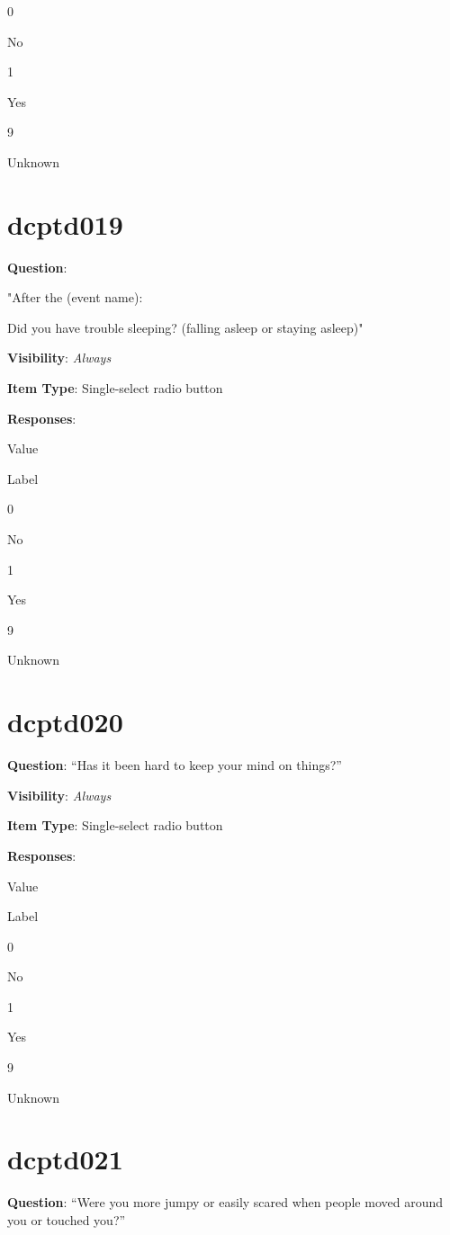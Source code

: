 \documentclass[]{book}
\begin{document}
0

No

1

Yes

9

Unknown

\hypertarget{dcptd019}{%
\section{dcptd019}\label{dcptd019}}

\textbf{Question}:

"After the (event name):

Did you have trouble sleeping? (falling asleep or staying asleep)"

\textbf{Visibility}: \emph{Always}

\textbf{Item Type}: Single-select radio button

\textbf{Responses}:

Value

Label

0

No

1

Yes

9

Unknown

\hypertarget{dcptd020}{%
\section{dcptd020}\label{dcptd020}}

\textbf{Question}: ``Has it been hard to keep your mind on things?''

\textbf{Visibility}: \emph{Always}

\textbf{Item Type}: Single-select radio button

\textbf{Responses}:

Value

Label

0

No

1

Yes

9

Unknown

\hypertarget{dcptd021}{%
\section{dcptd021}\label{dcptd021}}

\textbf{Question}: ``Were you more jumpy or easily scared when people moved around you or touched you?''
\end{document}
